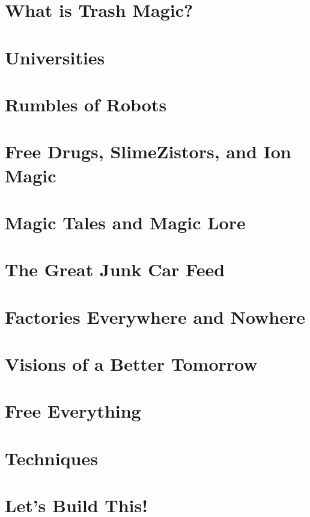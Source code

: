 \documentclass[ebook,12pt,openany,onesided]{memoir} %
\begin{document}
\chapter{What is Trash Magic?}


\chapter{Universities}


\chapter{Rumbles of Robots}


\chapter{Free Drugs, SlimeZistors, and Ion Magic}


\chapter{Magic Tales and Magic Lore}


\chapter{The Great Junk Car Feed}


\chapter{Factories Everywhere and Nowhere}


\chapter{Visions of a Better Tomorrow}


\chapter{Free Everything}


\chapter{Techniques}


\chapter{Let's Build This!}

\printindex

\end{document}
